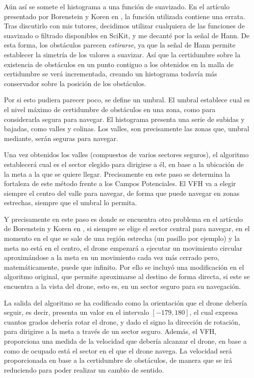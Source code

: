 Aún así se somete el histograma a una función de suavizado. En el artículo presentado por Borenstein y Koren en \citep{art:BorensteinKorenVFH}, la función utilizada contiene una errata. Tras discutirlo con mis tutores, decidimos utilizar cualquiera de las funciones de suavizado o filtrado disponibles en SciKit, y me decanté por la señal de Hann. 
De esta forma, los obstáculos parecen \textit{estirarse}, ya que la señal de Hann permite establecer la simetría de los valores a suavizar. Así que la certidumbre sobre la existencia de obstáculos en un punto contiguo a los obtenidos en la malla de certidumbre se verá incrementada, creando un histograma todavía más conservador sobre la posición de los obstáculos. 

Por si esto pudiera parecer poco, se define un umbral. El umbral establece cual es el nivel máximo de certidumbre de obstáculos en una zona, como para considerarla segura para navegar. 
El histograma presenta una serie de subidas y bajadas, como valles y colinas. Los valles, son precisamente las zonas que, umbral mediante, serán seguras para navegar.

Una vez obtenidos los valles (compuestos de varios sectores seguros), el algoritmo establecerá cual es el sector elegido para dirigirse a él, en base a la ubicación de la meta a la que se quiere llegar. 
Precisamente en este paso se determina la fortaleza de este método frente a los Campos Potenciales. El VFH va a elegir siempre el centro del valle para navegar, de forma que puede navegar en zonas estrechas, siempre que el umbral lo permita. 

Y precisamente en este paso es donde se encuentra otro problema en el artículo de Borenstein y Koren en \citep{art:BorensteinKorenVFH}, si siempre se elige el sector central para navegar, en el momento en el que se sale de una región estrecha (un pasillo por ejemplo) y la meta no está en el centro, el drone empezará a ejecutar un movimiento circular aproximándose a la meta en un movimiento cada vez más cerrado pero, matemáticamente, puede que infinito. Por ello se incluyó una modificación en el algoritmo original, que permite aproximarse al destino de forma directa, si este se encuentra a la vista del drone, esto es, en un sector seguro para su navegación.

La salida del algoritmo se ha codificado como la orientación que el drone debería seguir, es decir, presenta un valor en el intervalo $[-179, 180]$, el cual expresa cuantos grados debería rotar el drone, y dado el signo la dirección de rotación, para dirigirse a la meta a través de un sector seguro. 
Además, el VFH, proporciona una medida de la velocidad que debería alcanzar el drone, en base a como de ocupado está el sector en el que el drone navega. La velocidad será proporcionada en base a la certidumbre de obstáculos, de manera que se irá reduciendo para poder realizar un cambio de sentido.

